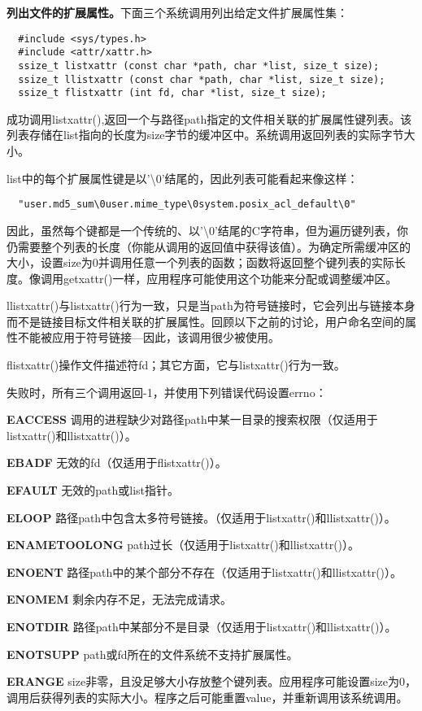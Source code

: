 \textbf{列出文件的扩展属性。}下面三个系统调用列出给定文件扩展属性集：

\begin{lstlisting}
  #include <sys/types.h>
  #include <attr/xattr.h>
  ssize_t listxattr (const char *path, char *list, size_t size);
  ssize_t llistxattr (const char *path, char *list, size_t size);
  ssize_t flistxattr (int fd, char *list, size_t size);
\end{lstlisting}

成功调用listxattr(),返回一个与路径path指定的文件相关联的扩展属性键列表。该列表存储在list指向的长度为size字节的缓冲区中。系统调用返回列表的实际字节大小。

list中的每个扩展属性键是以'\textbackslash0'结尾的，因此列表可能看起来像这样：

\begin{verbatim}
  "user.md5_sum\0user.mime_type\0system.posix_acl_default\0"
\end{verbatim}

因此，虽然每个键都是一个传统的、以'\textbackslash0'结尾的C字符串，但为遍历键列表，你仍需要整个列表的长度（你能从调用的返回值中获得该值）。为确定所需缓冲区的大小，设置size为0并调用任意一个列表的函数；函数将返回整个键列表的实际长度。像调用getxattr()一样，应用程序可能使用这个功能来分配或调整缓冲区。

llistxattr()与listxattr()行为一致，只是当path为符号链接时，它会列出与链接本身而不是链接目标文件相关联的扩展属性。回顾以下之前的讨论，用户命名空间的属性不能被应用于符号链接—因此，该调用很少被使用。

flistxattr()操作文件描述符fd；其它方面，它与listxattr()行为一致。

失败时，所有三个调用返回-1，并使用下列错误代码设置errno：

\begin{eqlist*}
\item[\textbf{EACCESS}] 调用的进程缺少对路径path中某一目录的搜索权限（仅适用于listxattr()和llistxattr()）。
\item[\textbf{EBADF}] 无效的fd（仅适用于flistxattr()）。
\item[\textbf{EFAULT}] 无效的path或list指针。
\item[\textbf{ELOOP}] 路径path中包含太多符号链接。（仅适用于listxattr()和llistxattr()）。
\item[\textbf{ENAMETOOLONG}] path过长（仅适用于listxattr()和llistxattr()）。
\item[\textbf{ENOENT}] 路径path中的某个部分不存在（仅适用于listxattr()和llistxattr()）。
\item[\textbf{ENOMEM}] 剩余内存不足，无法完成请求。
\item[\textbf{ENOTDIR}] 路径path中某部分不是目录（仅适用于listxattr()和llistxattr()）。
\item[\textbf{ENOTSUPP}] path或fd所在的文件系统不支持扩展属性。
\item[\textbf{ERANGE}] size非零，且没足够大小存放整个键列表。应用程序可能设置size为0，调用后获得列表的实际大小。程序之后可能重置value，并重新调用该系统调用。
\end{eqlist*}

